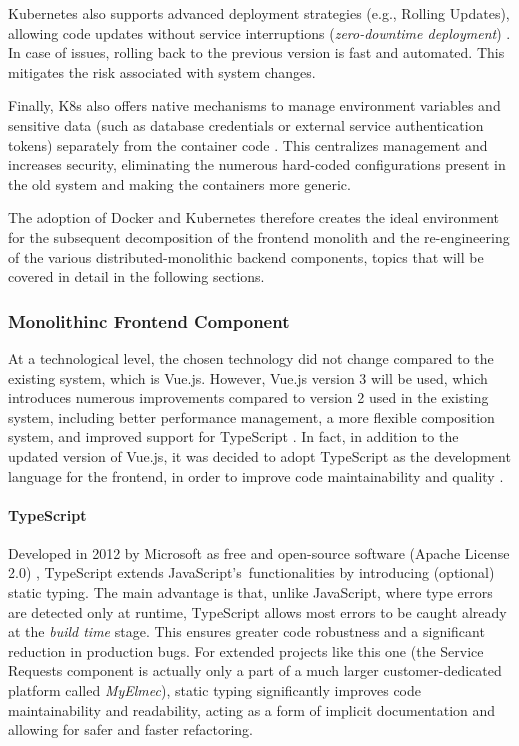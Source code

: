 Kubernetes also supports advanced deployment strategies (e.g., Rolling Updates), allowing code updates without service interruptions (\textit{zero-downtime deployment}) \cite{kube_book}. In case of issues, rolling back to the previous version is fast and automated. This mitigates the risk associated with system changes.

Finally, K8s also offers native mechanisms to manage environment variables and sensitive data (such as database credentials or external service authentication tokens) separately from the container code \cite{kube_book}. This centralizes management and increases security, eliminating the numerous hard-coded configurations present in the old system and making the containers more generic.

The adoption of Docker and Kubernetes therefore creates the ideal environment for the subsequent decomposition of the frontend monolith and the re-engineering of the various distributed-monolithic backend components, topics that will be covered in detail in the following sections.

\subsubsection{Monolithinc Frontend Component}
At a technological level, the chosen technology did not change compared to the existing system, which is Vue.js. However, Vue.js version 3 will be used, which introduces numerous improvements compared to version 2 used in the existing system, including better performance management, a more flexible composition system, and improved support for TypeScript \cite{vue3}.
In fact, in addition to the updated version of Vue.js, it was decided to adopt TypeScript as the development language for the frontend, in order to improve code maintainability and quality \cite{typescript}.

\paragraph{TypeScript} Developed in 2012 by Microsoft as free and open-source software (Apache License 2.0) \cite{typescript}, TypeScript extends JavaScript's~functionalities by introducing (optional) static typing. The main advantage is that, unlike JavaScript, where type errors are detected only at runtime, TypeScript allows most errors to be caught already at the \textit{build time} stage. This ensures greater code robustness and a significant reduction in production bugs. For extended projects like this one (the Service Requests component is actually only a part of a much larger customer-dedicated platform called \textit{MyElmec}), static typing significantly improves code maintainability and readability, acting as a form of implicit documentation and allowing for safer and faster refactoring.

